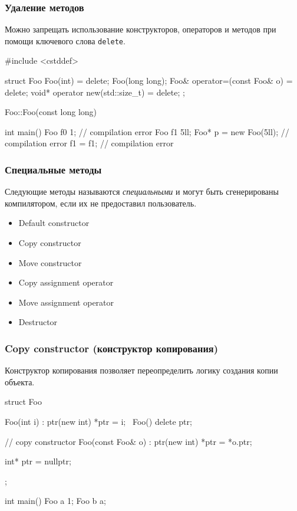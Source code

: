 \documentclass[compress, 8pt, aspectratio=169]{beamer}
\begin{document}
\begin{frame}[fragile]

    \frametitle{Удаление методов}

    Можно запрещать использование конструкторов, операторов
    и методов при помощи ключевого слова \texttt{delete}.

    \begin{myinplacelisting}[minted language=cpp]
#include <cstddef>

struct Foo {
    Foo(int) = delete;
    Foo(long long);
    Foo& operator=(const Foo& o) = delete;
    void* operator new(std::size_t) = delete;
};

Foo::Foo(const long long) {}

int main() {
    Foo f0 {1}; // compilation error
    Foo f1 {5ll};
    Foo* p = new Foo(5ll); // compilation error
    f1 = f1; // compilation error
}
    \end{myinplacelisting}

\end{frame}

\begin{frame}[fragile]

    \frametitle{Специальные методы}

    Следующие методы называются \textit{специальными} и могут быть
    сгенерированы компилятором, если их не предоставил пользователь.

    \hfill \break

    \begin{itemize}
        \item Default constructor
        \item Copy constructor
        \item Move constructor
        \item Copy assignment operator
        \item Move assignment operator
        \item Destructor
    \end{itemize}

\end{frame}

\begin{frame}[fragile]

    \frametitle{Copy constructor (конструктор копирования)}

    Конструктор копирования позволяет переопределить логику создания
    копии объекта.

    \begin{myinplacelisting}[minted language=cpp]
struct Foo {
    Foo(int i) : ptr(new int) { *ptr = i; }
    ~Foo() { delete ptr; }

    // copy constructor
    Foo(const Foo& o) : ptr(new int) {
        *ptr = *o.ptr;
    }

    int* ptr = nullptr;
};

int main() {
    Foo a {1};
    Foo b {a};
}
    \end{myinplacelisting}

\end{frame}
\end{document}
